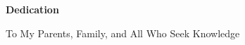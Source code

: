 \newpage
\begin{center}
\textbf{\LARGE{Dedication}}\\

\vspace{.5in}

\Large{To My Parents, Family, and All Who Seek Knowledge}


\end{center}
